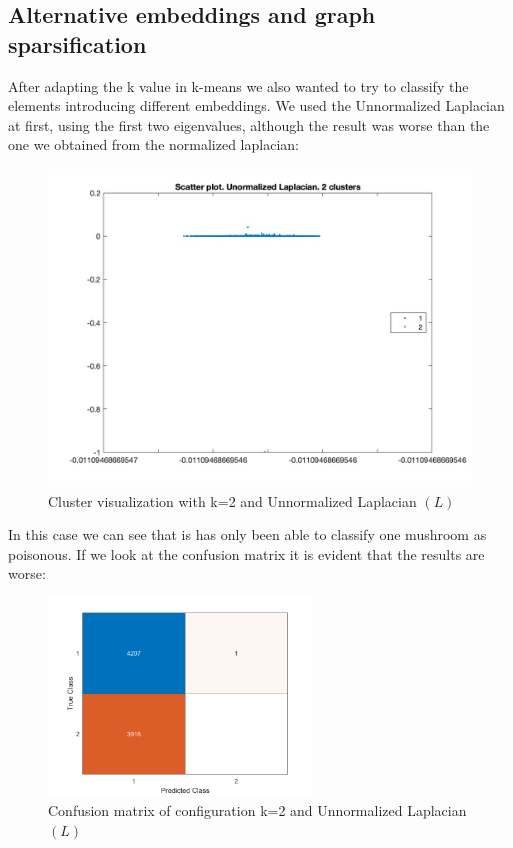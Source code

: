 \documentclass[12pt]{article}
\begin{document}
\subsection{Alternative embeddings and graph sparsification}
\justifying
After adapting the k value in k-means we also wanted to try to classify the elements introducing different embeddings. We used the Unnormalized Laplacian at first, using the first two eigenvalues, although the result was worse than the one we obtained from the normalized laplacian:
\smallskip
\begin{figure}[H]
	\centering
	\includegraphics[width=12cm]{5.jpg}
	\caption{Cluster visualization with k=2 and Unnormalized Laplacian $(L)$}
	\label{fig:Lapl2clusters}
\end{figure}
\smallskip
\justifying
In this case we can see that is has only been able to classify one mushroom as poisonous. If we look at the confusion matrix it is evident that the results are worse:
\smallskip
\begin{figure}[H]
	\centering
	\includegraphics[width=7cm]{confusionL.png}
	\caption{Confusion matrix of configuration k=2 and Unnormalized Laplacian $(L)$}
	\label{fig:confusionL}
\end{figure}
\end{document}

